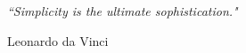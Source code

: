 

\chapter*{}

\textit{``Simplicity is the ultimate sophistication."}

\begin{flushright}
Leonardo da Vinci
\end{flushright}

\clearpage{\pagestyle{empty}\cleardoublepage}
